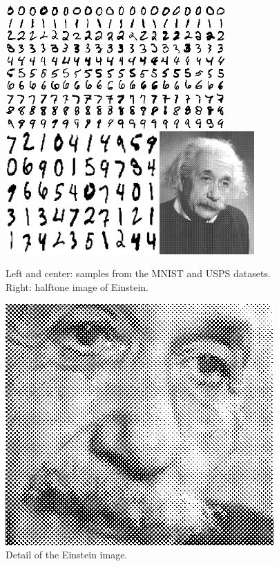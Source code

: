\documentclass[twocolumn]{IEEEtran}
\theoremstyle{definition}
\begin{document}
\begin{figure}[t]
\includegraphics[height=1.85in]{fig/mnist_bin.png} %
\includegraphics[height=1.85in]{fig/usps.png} %
\includegraphics[height=1.85in]{fig/einstein.png}
\caption{\label{fig:datasets} Left and center: samples from the MNIST and USPS datasets. Right: halftone image of Einstein.}
\end{figure}
%
\begin{figure}
\includegraphics[width=\columnwidth]{fig/einstein_zoom2.png}
\caption{\label{fig:einstein} Detail of the Einstein image.}
\end{figure}
\end{document}
